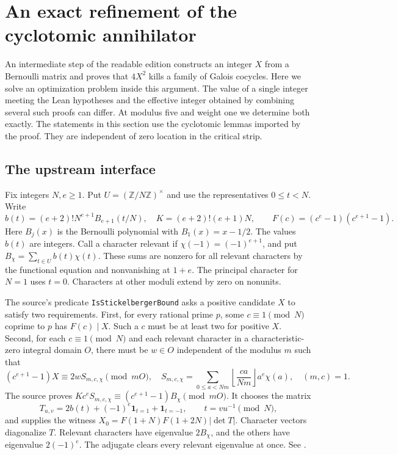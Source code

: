 \section{An exact refinement of the cyclotomic annihilator}
\label{sec:cyc}
An intermediate step of the readable edition constructs an integer $X$ from a
Bernoulli matrix and proves that $4X^2$ kills a family of Galois cocycles.
Here we solve an optimization problem inside this argument. The value of a
single integer meeting the Lean hypotheses and the effective integer obtained
by combining several such proofs can differ. At modulus five and weight one
we determine both exactly. The statements in this section use the cyclotomic
lemmas imported by the proof. They are independent of zero location in the
critical strip.

\subsection{The upstream interface}
Fix integers $N,e\ge1$. Put $U=(\mathbb Z/N\mathbb Z)^\times$ and use the
representatives $0\le t<N$. Write
\[
 b(t)=(e+2)!N^{e+1} B_{e+1}(t/N),\quad K=(e+2)!(e+1)N,\qquad
 F(c)=(c^e-1)(c^{e+1}-1).
\]
Here $B_j(x)$ is the Bernoulli polynomial with $B_1(x)=x-1/2$.
The values $b(t)$ are integers. Call a character relevant if
$\chi(-1)=(-1)^{e+1}$, and put
$B_\chi=\sum_{t\in U} b(t)\chi(t)$. These sums are nonzero for all relevant
characters by the functional equation and nonvanishing at $1+e$.
The principal character for $N=1$ uses $t=0$. Characters at other moduli
extend by zero on nonunits.

The source's predicate \texttt{IsStickelbergerBound} asks a positive
candidate $X$ to satisfy two requirements.
First, for every rational prime $p$, some $c\equiv1\pmod N$ coprime to $p$
has $F(c)\mid X$. Such a $c$ must be at least two for positive $X$.
Second, for each $c\equiv1\pmod N$ and each relevant character
in a characteristic-zero integral domain $O$, there must be $w\in O$
independent of the modulus $m$ such that
\begin{equation}
 (c^{e+1}-1)X\equiv 2w S_{m,c,\chi}\pmod{mO},\quad
 S_{m,c,\chi}=\sum_{0\le a<Nm}\left\lfloor\frac{ca}{Nm}\right\rfloor
 a^e\chi(a),\quad (m,c)=1.                         \label{eq:stick}
\end{equation}
The source proves
$Kc^eS_{m,c,\chi}\equiv(c^{e+1}-1)B_\chi\pmod{mO}$.
It chooses the matrix
\[
 T_{u,v}=2b(t)+(-1)^e\mathbf1_{t=1}+\mathbf1_{t=-1},\qquad
 t=vu^{-1}\pmod N ,
\]
and supplies the witness
$X_0=F(1+N)F(1+2N)|\det T|$. Character vectors diagonalize $T$.
Relevant characters have eigenvalue $2B_\chi$, and the others have
eigenvalue $2(-1)^e$. The adjugate clears every relevant eigenvalue at once.
See .

